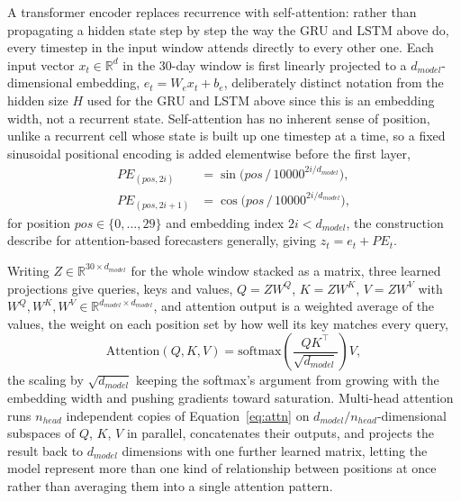 \documentclass[12pt,a4paper]{report}
\begin{document}
A transformer encoder \citep{lim2021survey} replaces recurrence with
self-attention: rather than propagating a hidden state step by step the way
the GRU and LSTM above do, every timestep in the input window attends
directly to every other one. Each input vector $x_t \in \mathbb{R}^d$ in the
30-day window is first linearly projected to a $d_{model}$-dimensional
embedding, $e_t = W_e x_t + b_e$, deliberately distinct notation from the
hidden size $H$ used for the GRU and LSTM above since this is an embedding
width, not a recurrent state. Self-attention has no inherent sense of
position, unlike a recurrent cell whose state is built up one timestep at a
time, so a fixed sinusoidal positional encoding is added elementwise before
the first layer,
\begin{align}
PE_{(pos,2i)} &= \sin\!\Big(pos \,/\, 10000^{2i/d_{model}}\Big), \label{eq:pe-sin}\\
PE_{(pos,2i+1)} &= \cos\!\Big(pos \,/\, 10000^{2i/d_{model}}\Big), \label{eq:pe-cos}
\end{align}
for position $pos \in \{0,\dots,29\}$ and embedding index $2i < d_{model}$,
the construction \citet{lim2021survey} describe for attention-based
forecasters generally, giving $z_t = e_t + PE_t$.

Writing $Z \in \mathbb{R}^{30 \times d_{model}}$ for the whole window stacked
as a matrix, three learned projections give queries, keys and values,
$Q = ZW^Q$, $K = ZW^K$, $V = ZW^V$ with $W^Q, W^K, W^V \in
\mathbb{R}^{d_{model}\times d_{model}}$, and attention output is a weighted
average of the values, the weight on each position set by how well its key
matches every query,
\begin{equation}
\mathrm{Attention}(Q,K,V) = \mathrm{softmax}\!\left(\frac{QK^\top}{\sqrt{d_{model}}}\right) V,
\label{eq:attn}
\end{equation}
the scaling by $\sqrt{d_{model}}$ keeping the softmax's argument from growing
with the embedding width and pushing gradients toward saturation.
Multi-head attention runs $n_{head}$ independent copies of
Equation~\ref{eq:attn} on $d_{model}/n_{head}$-dimensional subspaces of $Q$,
$K$, $V$ in parallel, concatenates their outputs, and projects the result
back to $d_{model}$ dimensions with one further learned matrix, letting the
model represent more than one kind of relationship between positions at
once rather than averaging them into a single attention pattern.
\end{document}

